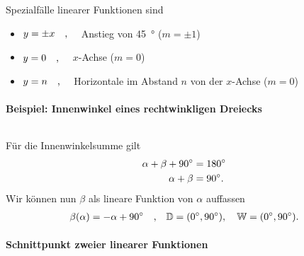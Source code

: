 Spezialfälle linearer Funktionen sind 
\begin{itemize}
    \item $y = \pm x \qq{,}$ Anstieg von \SI{45}{\degree} ($m = \pm 1$)
    \item $y = 0 \qq{,}$ $x$-Achse ($m = 0$)
    \item $y = n \qq{,}$ Horizontale im Abstand $n$ von der $x$-Achse ($m = 0$)
\end{itemize}

\paragraph{Beispiel: Innenwinkel eines rechtwinkligen Dreiecks}$~$

Für die Innenwinkelsumme gilt 
\begin{align}
    \alpha + \beta + \SI{90}{\degree} &= \SI{180}{\degree} \notag \\
    \alpha + \beta &= \SI{90}{\degree}.
\end{align}
Wir können nun $\beta$ als lineare Funktion von $\alpha$ auffassen 
\begin{align}
    \beta(\alpha) = -\alpha + \SI{90}{\degree} \qq{,} \mathbb{D} = (\SI{0}{\degree},\SI{90}{\degree}),\quad  \mathbb{W} = (\SI{0}{\degree},\SI{90}{\degree}).
\end{align}

\paragraph{Schnittpunkt zweier linearer Funktionen}$~$

